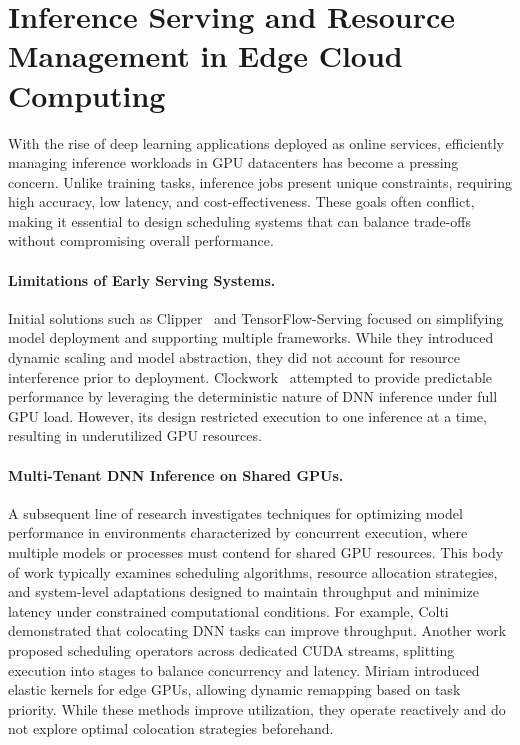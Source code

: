 \section{Inference Serving and Resource Management in Edge Cloud Computing}

With the rise of deep learning applications deployed as online services, efficiently managing inference workloads in GPU datacenters has become a pressing concern. Unlike training tasks, inference jobs present unique constraints, requiring high accuracy, low latency, and cost-effectiveness. These goals often conflict, making it essential to design scheduling systems that can balance trade-offs without compromising overall performance.

\paragraph{Limitations of Early Serving Systems.}
Initial solutions such as Clipper~\cite{2017clipper} and TensorFlow-Serving focused on simplifying model deployment and supporting multiple frameworks. While they introduced dynamic scaling and model abstraction, they did not account for resource interference prior to deployment. Clockwork~\cite{gujarati2020servingdnnslikeclockwork} attempted to provide predictable performance by leveraging the deterministic nature of DNN inference under full GPU load. However, its design restricted execution to one inference at a time, resulting in underutilized GPU resources.

\paragraph{Multi-Tenant DNN Inference on Shared GPUs.}
A subsequent line of research investigates techniques for optimizing model performance in environments characterized by concurrent execution, where multiple models or processes must contend for shared GPU resources. This body of work typically examines scheduling algorithms, resource allocation strategies, and system-level adaptations designed to maintain throughput and minimize latency under constrained computational conditions. For example, Colti~\cite{} demonstrated that colocating DNN tasks can improve throughput. Another work proposed scheduling operators across dedicated CUDA streams, splitting execution into stages to balance concurrency and latency. Miriam introduced elastic kernels for edge GPUs, allowing dynamic remapping based on task priority. While these methods improve utilization, they operate reactively and do not explore optimal colocation strategies beforehand.

